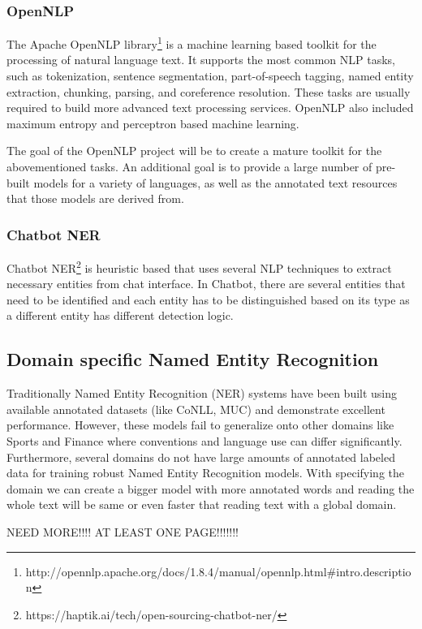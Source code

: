 \documentclass[thesis=M,english]{FITthesis}[2018/05/30]
\begin{document}
\subsubsection{OpenNLP}\label{OpenNLP}
The Apache OpenNLP library\footnote{http://opennlp.apache.org/docs/1.8.4/manual/opennlp.html\#intro.description} is a machine learning based toolkit for the processing of natural language text. It supports the most common NLP tasks, such as tokenization, sentence segmentation, part-of-speech tagging, named entity extraction, chunking, parsing, and coreference resolution. These tasks are usually required to build more advanced text processing services. OpenNLP also included maximum entropy and perceptron based machine learning.

The goal of the OpenNLP project will be to create a mature toolkit for the abovementioned tasks. An additional goal is to provide a large number of pre-built models for a variety of languages, as well as the annotated text resources that those models are derived from.

\subsubsection{Chatbot NER}\label{Chatbot NER}
Chatbot NER\footnote{https://haptik.ai/tech/open-sourcing-chatbot-ner/} is heuristic based that uses several NLP techniques to extract necessary entities from chat interface. In Chatbot, there are several entities that need to be identified and each entity has to be distinguished based on its type as a different entity has different detection logic. 

\subsection{Domain specific Named Entity Recognition}
Traditionally Named Entity Recognition (NER)\cite{article:DomainSpecific} systems have been built using available annotated datasets (like CoNLL, MUC) and demonstrate excellent performance. However, these models fail to generalize onto other domains like Sports and Finance where conventions and language use can differ significantly. Furthermore, several domains do not have large amounts of annotated labeled data for training robust Named Entity Recognition models.
With specifying the domain we can create a bigger model with more annotated words and reading the whole text will be same or even faster that reading text with a global domain.  

NEED MORE!!!! AT LEAST ONE PAGE!!!!!!!
\end{document}

